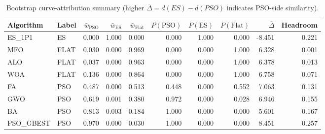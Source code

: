 \begin{table}
\caption{Bootstrap curve-attribution summary (higher $\overline{\Delta}=d(ES)-d(PSO)$ indicates PSO-side similarity). }
\label{tab:bootstrap_membership}
\begin{tabular}{llrrrrrrrr}
\toprule
Algorithm & Label & $\bar w_{\mathrm{PSO}}$ & $\bar w_{\mathrm{ES}}$ & $\bar w_{\mathrm{Flat}}$ & $P(\mathrm{PSO})$ & $P(\mathrm{ES})$ & $P(\mathrm{Flat})$ & $\overline{\Delta}$ & Headroom \\
\midrule
ES_1P1 & ES & 0.000 & 1.000 & 0.000 & 0.000 & 1.000 & 0.000 & -8.451 & 0.221 \\
MFO & FLAT & 0.030 & 0.000 & 0.969 & 0.000 & 0.000 & 1.000 & 6.328 & 0.001 \\
ALO & FLAT & 0.037 & 0.000 & 0.963 & 0.000 & 0.000 & 1.000 & 6.378 & 0.013 \\
WOA & FLAT & 0.136 & 0.000 & 0.864 & 0.000 & 0.000 & 1.000 & 6.758 & 0.071 \\
FA & PSO & 0.487 & 0.000 & 0.513 & 0.448 & 0.000 & 0.552 & 7.063 & 0.131 \\
GWO & PSO & 0.619 & 0.001 & 0.380 & 0.972 & 0.000 & 0.028 & 6.946 & 0.155 \\
BA & PSO & 0.813 & 0.003 & 0.184 & 1.000 & 0.000 & 0.000 & 5.601 & 0.167 \\
PSO_GBEST & PSO & 0.970 & 0.000 & 0.030 & 1.000 & 0.000 & 0.000 & 8.451 & 0.257 \\
\bottomrule
\end{tabular}
\end{table}
